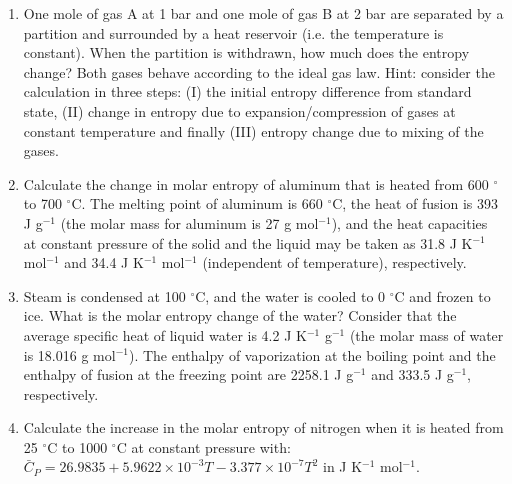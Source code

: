 \begin{enumerate}

\item One mole of gas A at 1 bar and one mole of gas B at 2 bar are separated by a partition and surrounded by a heat reservoir (i.e. the temperature is constant). When the partition is withdrawn, how much does the entropy change? Both gases behave according to the ideal gas law. Hint: consider the calculation in three steps: (I) the initial entropy difference from standard state, (II) change in entropy due to expansion/compression of gases at constant temperature and finally (III) entropy change due to mixing of the gases.


\item Calculate the change in molar entropy of aluminum that is heated from 600 $^\circ$ to 700 $^\circ$C. The melting point of aluminum is 660 $^\circ$C, the heat of fusion is 393 J g$^{-1}$ (the molar mass for aluminum is 27 g mol$^{-1}$), and the heat capacities at constant pressure of the solid and the liquid may be taken as 31.8 J K$^{-1}$ mol$^{-1}$ and 34.4 J K$^{-1}$ mol$^{-1}$ (independent of temperature), respectively.


\item Steam is condensed at 100 $^\circ$C, and the water is cooled to 0 $^\circ$C and frozen to ice. What is the molar entropy change of the water? Consider that the average specific heat of liquid water is 4.2 J K$^{-1}$ g$^{-1}$ (the molar mass of water is 18.016 g mol$^{-1}$). The enthalpy of vaporization at the boiling point and the enthalpy of fusion at the freezing point are 2258.1 J g$^{-1}$ and 333.5 J g$^{-1}$, respectively.


\item Calculate the increase in the molar entropy of nitrogen when it is heated from 25 $^\circ$C to 1000 $^\circ$C at constant pressure with: $\bar{C}_P = 26.9835 + 5.9622 \times 10^{-3}T - 3.377 \times 10^{-7}T^2$ in J K$^{-1}$ mol$^{-1}$.


\end{enumerate}

